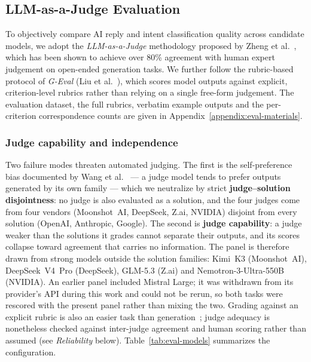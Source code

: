 \documentclass[a4paper]{article}
\begin{document}

\subsection{LLM-as-a-Judge Evaluation}
\label{sec:llm-judge}
\label{sec:eval}

To objectively compare AI reply and intent classification quality across
candidate models, we adopt the \emph{LLM-as-a-Judge} methodology proposed
by Zheng et al.~\cite{zheng2023judging}, which has been shown to achieve
over 80\% agreement with human expert judgement on open-ended generation
tasks. We further follow the rubric-based protocol of \emph{G-Eval}
(Liu et al.~\cite{liu2023geval}), which scores model outputs against
explicit, criterion-level rubrics rather than relying on a single
free-form judgement. The evaluation dataset, the full rubrics, verbatim
example outputs and the per-criterion correspondence counts are given in
Appendix~\ref{appendix:eval-materials}.

\subsubsection{Judge capability and independence}
Two failure modes threaten automated judging. The first is the
self-preference bias documented by Wang et al.~\cite{wang2023fairness}
--- a judge model tends to prefer outputs generated by its own family ---
which we neutralize by strict \textbf{judge--solution disjointness}: no
judge is also evaluated as a solution, and the four judges come from
four vendors (Moonshot~AI, DeepSeek, Z.ai, NVIDIA) disjoint from every solution
(OpenAI, Anthropic, Google). The second is \textbf{judge capability}: a judge weaker than the
solutions it grades cannot separate their outputs, and its scores collapse
toward agreement that carries no information. The panel is therefore drawn
from strong models outside the solution families: Kimi~K3 (Moonshot~AI),
DeepSeek~V4~Pro (DeepSeek), GLM-5.3 (Z.ai) and Nemotron-3-Ultra-550B (NVIDIA).
An earlier panel included Mistral Large; it was withdrawn from its provider's
API during this work and could not be rerun, so both tasks were rescored with
the present panel rather than mixing the two. Grading against an explicit rubric is also an easier task than
generation~\cite{zheng2023judging}; judge adequacy is nonetheless checked
against inter-judge agreement and human scoring rather than assumed (see
\emph{Reliability} below). Table~\ref{tab:eval-models} summarizes the
configuration.
\end{document}
